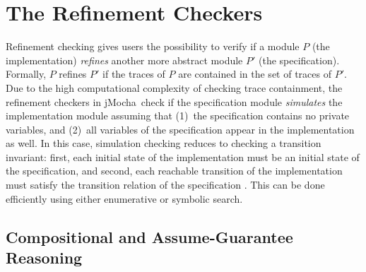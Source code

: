 \documentclass[10pt,twocolumn]{article}
\def\jmocha{{\small\sc jMocha}}
\def\mod{P}
\def\refines{\preceq}
\begin{document}
\section{The Refinement Checkers}
\label{sec:The Refinement Checkers}

Refinement checking gives users the possibility to verify if a module $\mod$ (the
implementation) \emph{refines} another more abstract module $\mod'$ (the specification).  
Formally, 
$\mod$ refines $\mod'$
if the traces
of $\mod$ are contained in the set of traces of $\mod'$.  
Due to the high computational complexity of checking trace containment,
the refinement checkers in \jmocha\ check if the specification module
{\em simulates} the implementation module assuming that 
(1)~the specification contains no private variables, and 
(2)~all variables of the specification appear in the implementation as well. 
In this case, simulation checking reduces to checking a transition invariant:
first, each initial state of the implementation
must be an initial state of the specification, and second, each reachable
transition of the implementation must satisfy the transition relation of 
the specification \cite{HQR98}. 
This can be done efficiently using either enumerative or symbolic search.  



\vspace*{-1mm}
\subsection{Compositional and Assume-Guarantee Reasoning}
\label{sec:Assume/Guarantee Reasoning}
\end{document}
